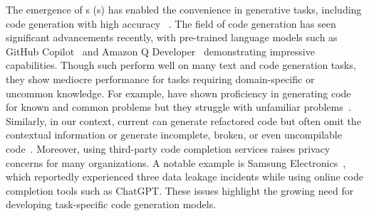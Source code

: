 The emergence of \llm{}s (\llmsc{}s)
has enabled the convenience in generative tasks, including code generation with high accuracy ~\cite{wang2021codet5identifierawareunifiedpretrained, ahmad2021}.
The field of code generation has seen significant advancements recently, with pre-trained language models such as GitHub Copilot~\cite{githubGitHubCopilot} and Amazon Q Developer~\cite{amazonCodingAssistant} demonstrating impressive capabilities.
Though such \llmsc{} perform well on many text and code generation tasks, they show mediocre performance for tasks requiring domain-specific or uncommon knowledge. 
For example, \llmsc{} have shown proficiency in generating code for known and common problems but they struggle with unfamiliar problems~\cite{chen2021evaluating}. 
Similarly, in our context,
current \llmsc{} can generate refactored code but often omit the contextual information or generate incomplete, broken, or even uncompilable code~\cite{jha2023codeattack}.
Moreover, using third-party code completion services raises privacy concerns for many organizations. A notable example is Samsung Electronics~\cite{JaiVijayan_2023}, which reportedly experienced three data leakage incidents while using online code completion tools such as ChatGPT. These issues highlight the growing need for developing task-specific code generation models. 


